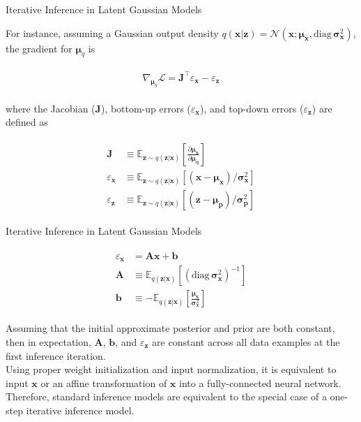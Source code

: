 \documentclass{beamer}		%
\newcommand{\E}{\mathbb{E}}
\begin{document}
\begin{frame}{Iterative Inference in Latent Gaussian Models}

For instance, assuming a Gaussian output density $q(\bm{x}|\bm{z})=\mathcal{N}(\bm{x};\bm{\mu}_{\bm{x}},\text{diag}\, \bm{\sigma}^2_{\bm{x}})$, the gradient for $\bm{\mu}_q$ is

\begin{eqnarray*}
\begin{aligned}
\nabla_{\bm{\mu}_q} \mathcal{L} = \bm{J}^\top \varepsilon_{\bm{x}} - \varepsilon_{\bm{z}}
\end{aligned}    
\end{eqnarray*}

where the Jacobian ($\bm{J}$), bottom-up errors ($\varepsilon_{\bm{x}}$), and top-down errors ($\varepsilon_{\bm{z}}$) are defined as

\begin{eqnarray*}
\begin{aligned}
\bm{J} &\equiv \E_{\bm{z} \sim q(\bm{z}|\bm{x})}[\frac{\partial \bm{\mu_x}}{\partial \bm{\mu_q}}]\\
\varepsilon_{\bm{x}} &\equiv  \E_{\bm{z} \sim q(\bm{z}|\bm{x})}[(\bm{x}-\bm{\mu_x}) / \bm{\sigma}_{\bm{x}}^2]\\
\varepsilon_{\bm{z}} &\equiv  \E_{\bm{z} \sim q(\bm{z}|\bm{x})}[(\bm{z}-\bm{\mu_p}) / \bm{\sigma}_{\bm{p}}^2]
\end{aligned}    
\end{eqnarray*}

\end{frame}



\begin{frame}{Iterative Inference in Latent Gaussian Models}

\begin{eqnarray*}
\begin{aligned}
\varepsilon_{\bm{x}} &= \bm{Ax+b}\\
\bm{A} &\equiv \E_{q(\bm{z}|\bm{x})}[(\text{diag}\, \bm{\sigma}^2_{\bm{x}})^{-1}]\\
\bm{b} &\equiv -\E_{q(\bm{z}|\bm{x})}[\frac{\bm{\mu_x}}{\bm{\sigma}^2_{\bm{x}}}]
\end{aligned}    
\end{eqnarray*}

Assuming that the initial approximate posterior and prior are both constant, then in expectation, $\bm{A}$, $\bm{b}$, and $\varepsilon_{\bm{z}}$ are constant across all data examples at the first inference iteration. \\
Using proper weight initialization and input normalization, it is equivalent to input $\bm{x}$ or an affine transformation of $\bm{x}$ into a fully-connected neural network.\\
Therefore, standard inference models are equivalent to the special case of a one-step iterative inference model.

\end{frame}
\end{document}
